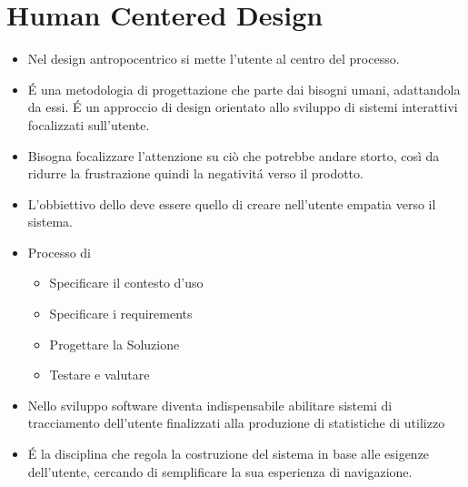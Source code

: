 \chapter{Human Centered Design}

\begin{itemize}
    \item Nel design antropocentrico si mette l'utente al centro del processo.
    \item {} \'E una metodologia di progettazione che parte dai bisogni umani, adattandola da essi. \'E un approccio di design orientato allo sviluppo di sistemi interattivi focalizzati sull'utente.
    \item Bisogna focalizzare l'attenzione su ci\`o che potrebbe andare storto, cos\`i da ridurre la frustrazione quindi la negativit\'a verso il prodotto.
    \item L'obbiettivo dello  deve essere quello di creare nell'utente empatia verso il sistema.
    \item Processo di 
    \begin{itemize}
        \item Specificare il contesto d'uso
        \item Specificare i requirements
        \item Progettare la Soluzione
        \item Testare e valutare
    \end{itemize}
    \item Nello sviluppo software diventa indispensabile abilitare sistemi di tracciamento dell'utente finalizzati alla produzione di statistiche di utilizzo
    \item {} \'E la disciplina che regola la costruzione del sistema in base alle esigenze dell'utente, cercando di semplificare la sua esperienza di navigazione.
\end{itemize}